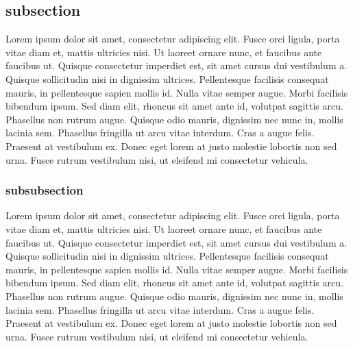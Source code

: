 \documentclass[conference]{IEEEtran}
\newcommand{\n}{\hfill\break}
\begin{document}
\subsection*{\textbf{subsection}}
Lorem ipsum dolor sit amet, consectetur adipiscing elit. Fusce orci ligula, porta vitae diam et, mattis ultricies nisi. Ut laoreet ornare nunc, et faucibus ante faucibus ut. Quisque consectetur imperdiet est, sit amet cursus dui vestibulum a. Quisque sollicitudin nisi in dignissim ultrices. Pellentesque facilisis consequat mauris, in pellentesque sapien mollis id. Nulla vitae semper augue. Morbi facilisis bibendum ipsum. Sed diam elit, rhoncus sit amet ante id, volutpat sagittis arcu. Phasellus non rutrum augue. Quisque odio mauris, dignissim nec nunc in, mollis lacinia sem. Phasellus fringilla ut arcu vitae interdum. Cras a augue felis. Praesent at vestibulum ex. Donec eget lorem at justo molestie lobortis non sed urna. Fusce rutrum vestibulum nisi, ut eleifend mi consectetur vehicula.\n
\subsubsection*{\textbf{subsubsection}}\hfill\break\indent
Lorem ipsum dolor sit amet, consectetur adipiscing elit. Fusce orci ligula, porta vitae diam et, mattis ultricies nisi. Ut laoreet ornare nunc, et faucibus ante faucibus ut. Quisque consectetur imperdiet est, sit amet cursus dui vestibulum a. Quisque sollicitudin nisi in dignissim ultrices. Pellentesque facilisis consequat mauris, in pellentesque sapien mollis id. Nulla vitae semper augue. Morbi facilisis bibendum ipsum. Sed diam elit, rhoncus sit amet ante id, volutpat sagittis arcu. Phasellus non rutrum augue. Quisque odio mauris, dignissim nec nunc in, mollis lacinia sem. Phasellus fringilla ut arcu vitae interdum. Cras a augue felis. Praesent at vestibulum ex. Donec eget lorem at justo molestie lobortis non sed urna. Fusce rutrum vestibulum nisi, ut eleifend mi consectetur vehicula.\n

{}
 
\end{document}
